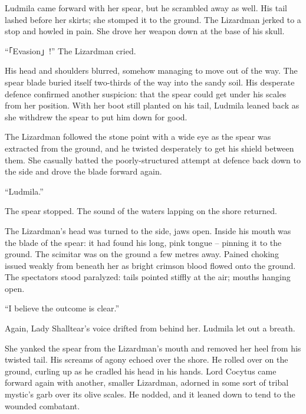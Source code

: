  

Ludmila came forward with her spear, but he scrambled away as well. His tail lashed before her skirts; she stomped it to the ground. The Lizardman jerked to a stop and howled in pain. She drove her weapon down at the base of his skull.

 

“「Evasion」!” The Lizardman cried.

 

His head and shoulders blurred, somehow managing to move out of the way. The spear blade buried itself two-thirds of the way into the sandy soil. His desperate defence confirmed another suspicion: that the spear could get under his scales from her position. With her boot still planted on his tail, Ludmila leaned back as she withdrew the spear to put him down for good.

 

The Lizardman followed the stone point with a wide eye as the spear was extracted from the ground, and he twisted desperately to get his shield between them. She casually batted the poorly-structured attempt at defence back down to the side and drove the blade forward again.

 

“Ludmila.”

 

The spear stopped. The sound of the waters lapping on the shore returned.

 

The Lizardman’s head was turned to the side, jaws open. Inside his mouth was the blade of the spear: it had found his long, pink tongue – pinning it to the ground. The scimitar was on the ground a few metres away. Pained choking issued weakly from beneath her as bright crimson blood flowed onto the ground. The spectators stood paralyzed: tails pointed stiffly at the air; mouths hanging open.

 

“I believe the outcome is clear.”

 

Again, Lady Shalltear’s voice drifted from behind her. Ludmila let out a breath.

 

She yanked the spear from the Lizardman’s mouth and removed her heel from his twisted tail. His screams of agony echoed over the shore. He rolled over on the ground, curling up as he cradled his head in his hands. Lord Cocytus came forward again with another, smaller Lizardman, adorned in some sort of tribal mystic’s garb over its olive scales. He nodded, and it leaned down to tend to the wounded combatant.

